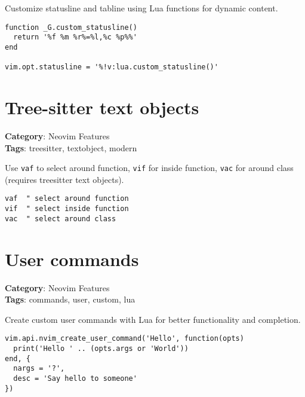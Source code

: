 {{{{{{{{{{Customize statusline and tabline using Lua functions for dynamic content.

\begin{Exa*}{}
\begin{Verbatim}[fontsize=\footnotesize, breaklines, breakanywhere]
function _G.custom_statusline()
  return '%f %m %r%=%l,%c %p%%'
end

vim.opt.statusline = '%!v:lua.custom_statusline()'
\end{Verbatim}
\end{Exa*}

\section{Tree-sitter text objects}

\textbf{Category}: Neovim Features\\ \textbf{Tags}: treesitter, textobject, modern
\vspace{0.5cm}

Use {\footnotesize \Verb§vaf§} to select around function, {\footnotesize \Verb§vif§} for inside function, {\footnotesize \Verb§vac§} for around class (requires treesitter text objects).

\begin{Exa*}{}
\begin{Verbatim}[fontsize=\footnotesize, breaklines, breakanywhere]
vaf  " select around function
vif  " select inside function
vac  " select around class
\end{Verbatim}
\end{Exa*}

\section{User commands}

\textbf{Category}: Neovim Features\\ \textbf{Tags}: commands, user, custom, lua
\vspace{0.5cm}

Create custom user commands with Lua for better functionality and completion.

\begin{Exa*}{}
\begin{Verbatim}[fontsize=\footnotesize, breaklines, breakanywhere]
vim.api.nvim_create_user_command('Hello', function(opts)
  print('Hello ' .. (opts.args or 'World'))
end, {
  nargs = '?',
  desc = 'Say hello to someone'
})
\end{Verbatim}
\end{Exa*}

}}}}}}}}}}
